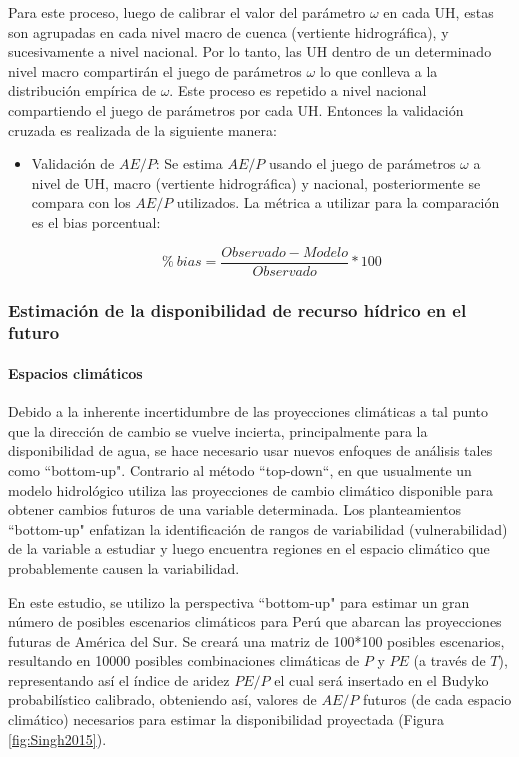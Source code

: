 \documentclass[12pt]{article}
\begin{document}
Para este proceso, luego de calibrar el valor del parámetro $\omega$ en cada UH, estas son agrupadas en cada nivel macro de cuenca (vertiente hidrográfica), y sucesivamente a nivel nacional. Por lo tanto, las UH dentro de un determinado nivel macro compartirán el juego de parámetros $\omega$ lo que conlleva a la distribución empírica de $\omega$. Este proceso es repetido a nivel nacional compartiendo el juego de parámetros por cada UH. Entonces la validación cruzada es realizada de la siguiente manera:

\begin{itemize}
  \item Validación de $AE/P$: Se estima $AE/P$ usando el juego de parámetros $\omega$ a nivel de UH, macro (vertiente hidrográfica) y nacional, posteriormente se compara con los $AE/P$ utilizados. La métrica a utilizar para la comparación es el bias porcentual:
  
    \begin{equation}
    \%\ bias = \frac{Observado-Modelo}{Observado}*100
    \end{equation}
\end{itemize}


\subsubsection{Estimación de la disponibilidad de recurso hídrico en el futuro}

\paragraph{Espacios climáticos}\mbox{}

Debido a la inherente incertidumbre de las proyecciones climáticas a tal punto que la dirección de cambio se vuelve incierta, principalmente para la disponibilidad de agua, se hace necesario usar nuevos enfoques de análisis tales como “bottom-up". Contrario al método “top-down“, en que usualmente un modelo hidrológico utiliza las proyecciones de cambio climático disponible para obtener cambios futuros de una variable determinada. Los planteamientos “bottom-up" enfatizan la identificación de rangos de variabilidad (vulnerabilidad) de la variable a estudiar y luego encuentra regiones en el espacio climático que probablemente causen la variabilidad.

En este estudio, se utilizo la perspectiva “bottom-up" para estimar un gran número de posibles escenarios climáticos para Perú que abarcan las proyecciones futuras de América del Sur. Se creará una matriz de 100*100 posibles escenarios, resultando en 10000 posibles combinaciones climáticas de $P$ y $PE$ (a través de $T$), representando así el índice de aridez $PE/P$ el cual será insertado en el Budyko probabilístico calibrado, obteniendo así, valores de $AE/P$ futuros (de cada espacio climático) necesarios para estimar la disponibilidad proyectada (Figura \ref{fig:Singh2015}).
\end{document}
